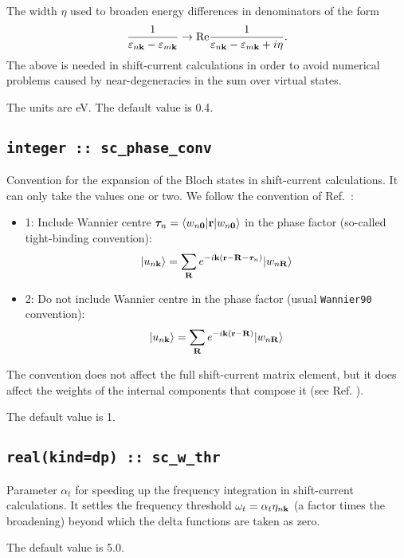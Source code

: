 The width $\eta$ used to broaden energy differences in denominators of the form 
%
$$
\frac{1}{\varepsilon_{n\bf{k}}-\varepsilon_{m\bf{k}}}\rightarrow
\text{Re}\frac{1}{\varepsilon_{n\bf{k}}-\varepsilon_{m\bf{k}}+i\eta}.
$$ 
%
The above is needed in shift-current calculations in order to avoid numerical problems
caused by near-degeneracies in the sum over virtual states. 

The units are eV. The default value is 0.4.


\subsection{\tt integer :: sc\_phase\_conv}

Convention for the expansion of the Bloch states in shift-current calculations. It can only take the values one or two.
We follow the convention of Ref.~\cite{pythtb}:
\begin{itemize}

\item
  1: Include Wannier centre ${\bm \tau}_{n}=\langle w_{n{\bf 0}}|{\bf r}| w_{n{\bf 0}} \rangle$ in the phase factor
  (so-called tight-binding convention):
%
$$
|u_{n\bf{k}}\rangle = \sum_{\bf{R}} e^{-i{\bf k}({\bf r}-{\bf R}-{\bm \tau}_{n})}| w_{n\bf{R}} \rangle
$$ 
%

\item
  2: Do not include Wannier centre in the phase factor (usual \verb|Wannier90| convention):
%
$$
|u_{n\bf{k}}\rangle = \sum_{\bf{R}} e^{-i\bf{k}(\bf{r}-\bf{R})}| w_{n\bf{R}} \rangle
$$ 
%
\end{itemize}
The convention does not affect the full shift-current matrix element, but it does affect
the weights of the internal components that compose it (see Ref. \cite{ibanez-azpiroz_ab_2018}). 

The default value is 1. 


\subsection{\tt real(kind=dp)  :: sc\_w\_thr}

Parameter $\alpha_{t}$ for speeding up the frequency integration in shift-current calculations.
It settles the frequency threshold $\omega_{t}=\alpha_{t}\eta_{n{\bf k}}$
(a factor times the broadening)
beyond which the delta functions are taken as zero. 


The default value is 5.0. 






